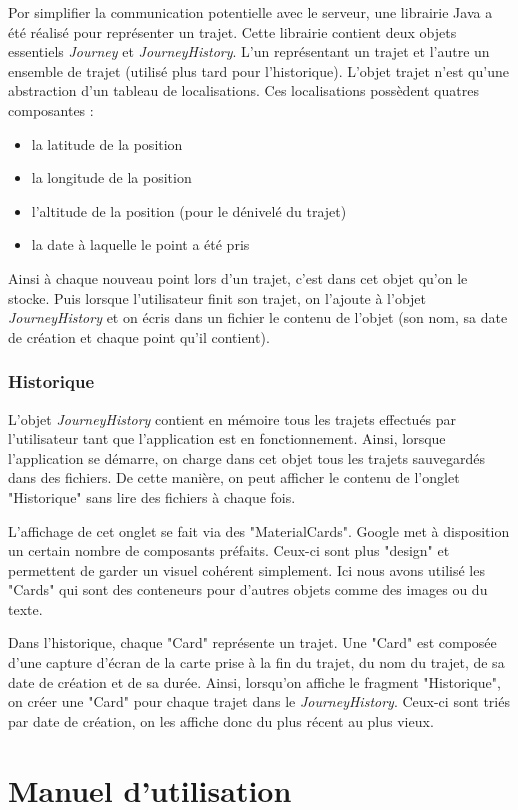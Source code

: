\documentclass{article}
\begin{document}
Por simplifier la communication potentielle avec le serveur, une librairie Java a été réalisé pour représenter un trajet. Cette librairie
contient deux objets essentiels \emph{Journey} et \emph{JourneyHistory}. L'un représentant un trajet et l'autre un ensemble de trajet
(utilisé plus tard pour l'historique). L'objet trajet n'est qu'une abstraction d'un tableau de localisations. Ces localisations possèdent
quatres composantes :
\begin{itemize}
  \item la latitude de la position
  \item la longitude de la position
  \item l'altitude de la position (pour le dénivelé du trajet)
  \item la date à laquelle le point a été pris
\end{itemize}
Ainsi à chaque nouveau point lors d'un trajet, c'est dans cet objet qu'on le stocke. Puis lorsque l'utilisateur finit son trajet,
on l'ajoute à l'objet \emph{JourneyHistory} et on écris dans un fichier le contenu de l'objet (son nom, sa date de création et chaque
point qu'il contient).

\subsubsection{Historique}
L'objet \emph{JourneyHistory} contient en mémoire tous les trajets effectués par l'utilisateur tant que l'application est en fonctionnement.
Ainsi, lorsque l'application se démarre, on charge dans cet objet tous les trajets sauvegardés dans des fichiers. De cette manière, on peut
afficher le contenu de l'onglet "Historique" sans lire des fichiers à chaque fois.

L'affichage de cet onglet se fait via des "MaterialCards". Google met à disposition un certain nombre de composants préfaits. Ceux-ci sont
plus "design" et permettent de garder un visuel cohérent simplement. Ici nous avons utilisé les "Cards" qui sont des conteneurs pour d'autres
objets comme des images ou du texte.

Dans l'historique, chaque "Card" représente un trajet. Une "Card" est composée d'une capture d'écran de la carte prise à la fin du trajet,
du nom du trajet, de sa date de création et de sa durée. Ainsi, lorsqu'on affiche le fragment "Historique", on créer une "Card" pour
chaque trajet dans le \emph{JourneyHistory}. Ceux-ci sont triés par date de création, on les affiche donc du plus récent au plus vieux.


\newpage
\appendix
\section{Manuel d'utilisation}
\end{document}
